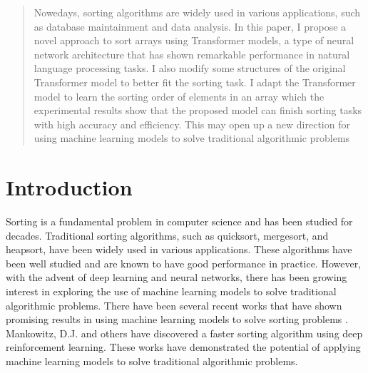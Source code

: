 \documentclass{article}
\begin{document}

\vspace{45mm}


\begin{abstract}
    Nowedays, sorting algorithms are widely used in various applications, such as database maintainment and data analysis. In this paper, I propose a novel approach to sort arrays using Transformer models, a type of neural network architecture that has shown remarkable performance in natural language processing tasks. I also modify some structures of the original Transformer model to better fit the sorting task. I adapt the Transformer model to learn the sorting order of elements in an array which the experimental results show that the proposed model can finish sorting tasks with high accuracy and efficiency. This may open up a new direction for using machine learning models to solve traditional algorithmic problems
\end{abstract}

\section{Introduction}
Sorting is a fundamental problem in computer science and has been studied for decades. Traditional sorting algorithms, such as quicksort, mergesort, and heapsort, have been widely used in various applications. These algorithms have been well studied and are known to have good performance in practice. However, with the advent of deep learning and neural networks, there has been growing interest in exploring the use of machine learning models to solve traditional algorithmic problems. There have been several recent works that have shown promising results in using machine learning models to solve sorting problems \cite{SortNet}. Mankowitz, D.J. and others \cite{FasterSorting} have discovered a faster sorting algorithm using deep reinforcement learning. These works have demonstrated the potential of applying machine learning models to solve traditional algorithmic problems.
\end{document}
